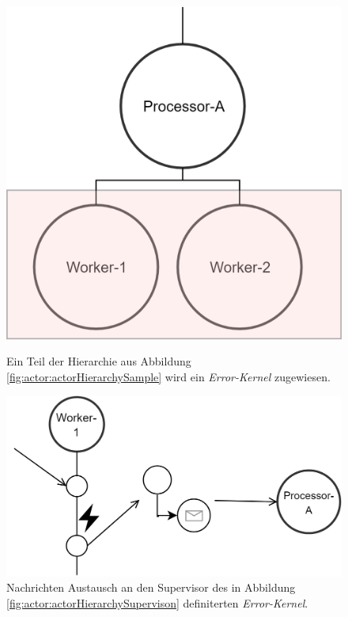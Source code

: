 \begin{figure}
    \centering
    \begin{minipage}{.4\textwidth}
        \centering
        \includegraphics[width=\linewidth]{gfx/actor/actorHierchyErrorKernel}
        \caption{Ein Teil der Hierarchie aus Abbildung \ref{fig:actor:actorHierarchySample} wird ein \textit{Error-Kernel} zugewiesen.}
        \label{fig:actor:actorHierarchySupervison}        
    \end{minipage}%
    \begin{minipage}{.1\textwidth}
    \end{minipage}%
    \begin{minipage}{.5\textwidth}
      \centering
      \includegraphics[width=\linewidth]{gfx/actor/actorSupervisionMessageExample}
      \caption{Nachrichten Austausch an den Supervisor des in Abbildung \ref{fig:actor:actorHierarchySupervison} definiterten \textit{Error-Kernel}.}
      \label{fig:actor:actorHierarchySupervisonMessaging}
    \end{minipage}
\end{figure}  

